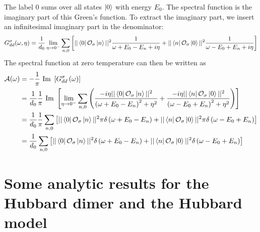 \documentclass{report}
\numberwithin{equation}{section}
\begin{document}
\begin{appendices}
The label 0 sums over all states \(\ket{0}\) with energy \(E_0\). The spectral function is the imaginary part of this Green's function. To extract the imaginary part, we insert an infinitesimal imaginary part in the denominator:
\begin{equation}\begin{aligned}
	G_{d d}^\sigma(\omega, \eta) = \frac{1}{d_0}\lim_{\eta \to 0^-}\sum_{n,0}\left[||\bra{0}\mathcal{O}_{\sigma}\ket{n}||^2\frac{1}{\omega + E_0 - E_n + i\eta} + ||\bra{n}\mathcal{O}_{\sigma}\ket{0}||^2\frac{1}{\omega - E_0 + E_n + i\eta}\right]\\
\end{aligned}\end{equation}
The spectral function at zero temperature can then be written as
\begin{equation}\begin{aligned}
	\mathcal{A(\omega)} &= -\frac{1}{\pi}\text{ Im }\left[G_{dd}^\sigma\left( \omega \right) \right] \\
			    &= \frac{1}{d_0}\frac{1}{\pi}\text{ Im }\left[\lim_{\eta \to 0^-}\sum_{n,0}\left(\frac{-i\eta ||\bra{0}\mathcal{O}_{\sigma}\ket{n}||^2}{\left(\omega + E_0 - E_n\right)^2 + \eta^2} + \frac{-i\eta ||\bra{n}\mathcal{O}_{\sigma}\ket{0}||^2}{\left(\omega - E_0 + E_n\right)^2 + \eta^2}\right)\right]\\
			    &= \frac{1}{d_0}\frac{1}{\pi}\sum_{n,0}\left[||\bra{0}\mathcal{O}_{\sigma}\ket{n}||^2\pi\delta\left(\omega + E_0 - E_n\right) + ||\bra{n}\mathcal{O}_{\sigma}\ket{0}||^2\pi\delta\left(\omega - E_0 + E_n\right)\right]\\
			    &= \frac{1}{d_0}\sum_{n,0}\left[||\bra{0}\mathcal{O}_{\sigma}\ket{n}||^2\delta\left(\omega + E_0 - E_n\right) + ||\bra{n}\mathcal{O}_{\sigma}\ket{0}||^2\delta\left(\omega - E_0 + E_n\right)\right]\\
\end{aligned}\end{equation}

\chapter{Some analytic results for the Hubbard dimer and the Hubbard model}

\end{appendices}
\end{document}
